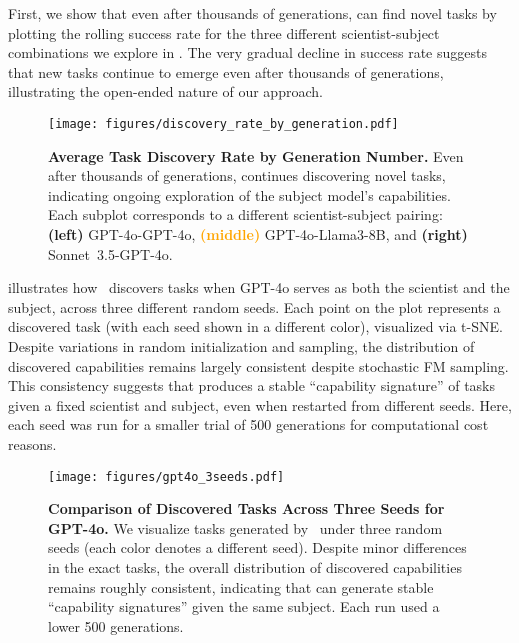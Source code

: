 First, we show that even after thousands of generations, \ouralgo can find novel tasks by plotting the rolling success rate for the three different scientist-subject combinations we explore in .
The very gradual decline in success rate suggests that new tasks continue to emerge even after thousands of generations, illustrating the open-ended nature of our approach.

\begin{figure}[h!]
\centering
\texttt{[image: figures/discovery\_rate\_by\_generation.pdf]}
\caption{\textbf{Average Task Discovery Rate by Generation Number.} Even after thousands of generations, \ouralgo continues discovering novel tasks, indicating ongoing exploration of the subject model's capabilities. Each subplot corresponds to a different scientist-subject pairing: \textcolor{JungleGreen}{\textbf{(left)}} GPT-4o-GPT-4o, \textcolor{Orange}{\textbf{(middle)}} GPT-4o-Llama3-8B, and \textcolor{Cerulean}{\textbf{(right)}} Sonnet~3.5-GPT-4o.}
\label{fig:discovery_rate_by_generation}
\end{figure}

 illustrates how \ouralgo\ discovers tasks when GPT-4o serves as both the scientist and the subject, across three different random seeds.
Each point on the plot represents a discovered task (with each seed shown in a different color), visualized via t-SNE.
Despite variations in random initialization and sampling, the distribution of discovered capabilities remains largely consistent despite stochastic FM sampling.
This consistency suggests that \ouralgo produces a stable ``capability signature'' of tasks given a fixed scientist and subject, even when restarted from different seeds.
Here, each seed was run for a smaller trial of 500 generations for computational cost reasons.

\begin{figure}[h!]
\centering
\texttt{[image: figures/gpt4o\_3seeds.pdf]}
\caption{\textbf{Comparison of Discovered Tasks Across Three Seeds for GPT-4o.} We visualize tasks generated by \ouralgo\ under three random seeds (each color denotes a different seed). Despite minor differences in the exact tasks, the overall distribution of discovered capabilities remains roughly consistent, indicating that \ouralgo can generate stable ``capability signatures'' given the same subject. Each run used a lower 500 generations.}
\label{fig:gpt4o_3seeds}
\end{figure}

